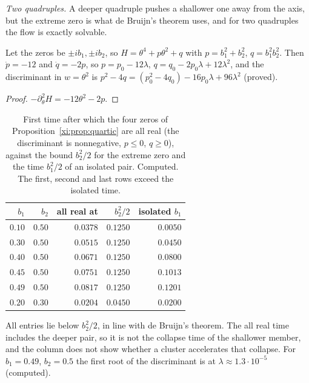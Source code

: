 \emph{Two quadruples.} A deeper quadruple pushes a shallower one away from the axis, but the extreme zero is what de Bruijn's theorem uses, and for two quadruples the flow is exactly solvable.

\begin{proposition}\label{xi:prop:quartic}
Let the zeros be $\pm ib_1,\pm ib_2$, so $H=\theta^4+p\theta^2+q$ with $p=b_1^2+b_2^2$, $q=b_1^2b_2^2$. Then $\dot p=-12$ and $\dot q=-2p$, so $p=p_0-12\lambda$, $q=q_0-2p_0\lambda+12\lambda^2$, and the discriminant in $w=\theta^2$ is $p^2-4q=(p_0^2-4q_0)-16p_0\lambda+96\lambda^2$ (proved).
\end{proposition}

\begin{proof}
$-\partial_\theta^2H=-12\theta^2-2p$.
\end{proof}

\begin{table}[htbp]
\centering\small
\begin{tabular}{@{}rrrrr@{}}
\toprule
$b_1$ & $b_2$ & all real at & $b_2^2/2$ & isolated $b_1$\\
\midrule
$0.10$ & $0.50$ & $0.0378$ & $0.1250$ & $0.0050$\\
$0.30$ & $0.50$ & $0.0515$ & $0.1250$ & $0.0450$\\
$0.40$ & $0.50$ & $0.0671$ & $0.1250$ & $0.0800$\\
$0.45$ & $0.50$ & $0.0751$ & $0.1250$ & $0.1013$\\
$0.49$ & $0.50$ & $0.0817$ & $0.1250$ & $0.1201$\\
$0.20$ & $0.30$ & $0.0204$ & $0.0450$ & $0.0200$\\
\bottomrule
\end{tabular}
\caption{First time after which the four zeros of Proposition~\ref{xi:prop:quartic} are all real (the discriminant is nonnegative, $p\le0$, $q\ge0$), against the bound $b_2^2/2$ for the extreme zero and the time $b_1^2/2$ of an isolated pair. Computed. The first, second and last rows exceed the isolated time.}
\label{xi:tab:twoquad}
\end{table}

All entries lie below $b_2^2/2$, in line with de Bruijn's theorem. The all real time includes the deeper pair, so it is not the collapse time of the shallower member, and the column does not show whether a cluster accelerates that collapse. For $b_1=0.49$, $b_2=0.5$ the first root of the discriminant is at $\lambda\approx1.3\cdot10^{-5}$ (computed).


